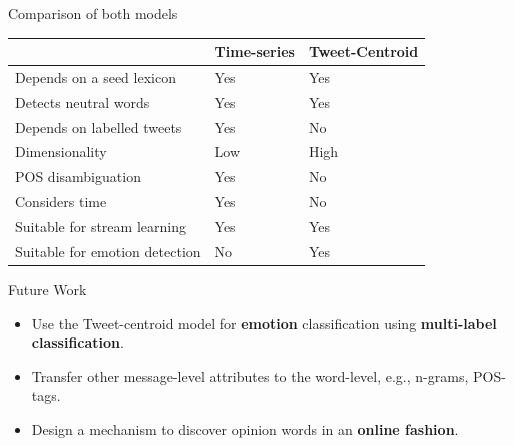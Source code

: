 \documentclass[handout]{beamer}
\begin{document}
\begin{frame}{Comparison of both models}
\begin{scriptsize}
\begin{table}[htbp]
\begin{center}
\begin{tabular}{l|l|l}
\hline
 & Time-series & Tweet-Centroid \\ \hline
Depends on a seed lexicon & Yes & Yes \\ 
Detects neutral words & Yes & Yes \\ 
Depends on labelled tweets & Yes & No \\ 
Dimensionality & Low & High \\ 
POS disambiguation & Yes & No \\ 
Considers time & Yes & No \\ 
Suitable for stream learning & Yes & Yes \\ 
Suitable for emotion detection & No & Yes \\ \hline
\end{tabular}
\end{center}
\end{table}
\end{scriptsize}
\end{frame}







\begin{frame}{Future Work}
\begin{scriptsize}
\begin{itemize}
\item Use the Tweet-centroid model for \textbf{emotion} classification using \textbf{multi-label classification}.
\item Transfer other message-level attributes to the word-level, e.g., n-grams, POS-tags.
\item Design a mechanism to discover opinion words in an \textbf{online fashion}.
\end{itemize}




\end{scriptsize}
\end{frame}
\end{document}
